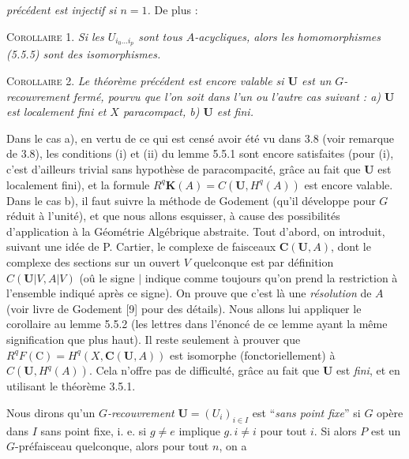 \clearpage
{}

\noindent\textit{précédent est injectif si $n=1$.} De plus :

\textsc{Corollaire 1.} \textit{Si les $U_{i_0\ldots i_p}$ sont tous
$A$-acycliques, alors les homomorphismes \textup{(5.5.5)} sont des isomorphismes.}

\textsc{Corollaire 2.} \textit{Le théorème précédent est encore
valable si ${\mathbf U}$ est un $G$-recouvrement fermé, pourvu que l'on soit dans
l'un ou l'autre cas suivant : a) ${\mathbf U}$ est localement fini et $X$
paracompact, b) ${\mathbf U}$ est fini.}

Dans le cas a), en vertu de ce qui est censé avoir été vu dans 3.8 (voir
remarque de 3.8), les conditions (i) et (ii) du lemme 5.5.1 sont encore
satisfaites (pour (i), c'est d'ailleurs trivial sans hypothèse de
paracompacité, grâce au fait que ${\mathbf U}$ est localement fini), et la
formule $R^q\mathbf K(A)=C({\mathbf U},H^q(A))$ est encore valable. Dans le cas
b), il faut suivre la méthode de Godement (qu'il développe pour $G$ réduit à
l'unité), et que nous allons esquisser, à cause des possibilités d'application
à la Géométrie Algébrique abstraite. Tout d'abord, on introduit, suivant une
idée de P. Cartier, le complexe de faisceaux ${\mathbf C}({\mathbf U},A)$, dont le complexe
des sections sur un ouvert $V$ quelconque est par définition
$C({\mathbf U}|V,A|V)$ (oû le signe $|$ indique comme toujours qu'on prend la
restriction à l'ensemble indiqué après ce signe). On prouve que c'est là une
\emph{résolution} de $A$ (voir livre de Godement [9] pour des détails). Nous allons lui
appliquer le corollaire au lemme 5.5.2 (les lettres dans l'énoncé de ce lemme
ayant la même signification que plus haut). Il reste seulement à prouver que
$R^qF(\mathrm C)=H^q(X,{\mathbf C}({\mathbf U},A))$ est isomorphe (fonctoriellement) à
$C({\mathbf U},H^q(A))$. Cela n'offre pas de difficulté, grâce au fait que
${\mathbf U}$ est \emph{fini}, et en utilisant le théorème 3.5.1.

Nous dirons qu'un \emph{$G$-recouvrement} ${\mathbf U}=(U_i)_{i\in I}$ est ``\emph{sans point fixe}'' si $G$ opère dans $I$ sans point fixe, i. e. si $g\ne e$ implique
$g.\, i\ne i$ pour tout $i$. Si alors $P$ est un $G$-préfaisceau quelconque,
alors pour tout $n$, on a

